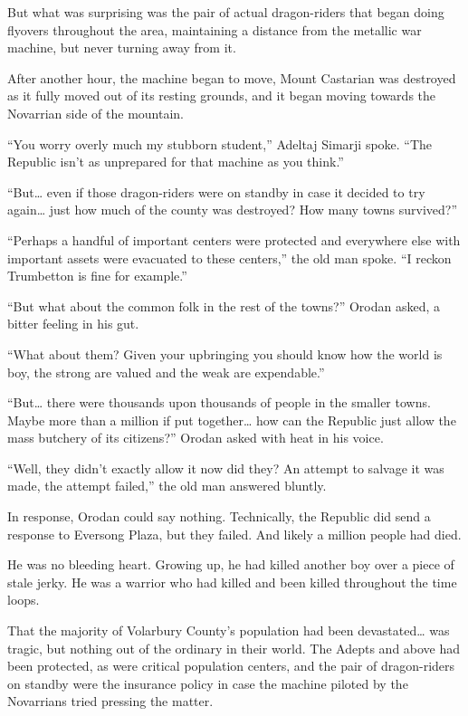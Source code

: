 \documentclass[a4paper,10pt]{book}
\begin{document}
But what was surprising was the pair of actual dragon-riders that began doing flyovers throughout the area, maintaining a distance from the metallic war machine, but never turning away from it.\par
After another hour, the machine began to move, Mount Castarian was destroyed as it fully moved out of its resting grounds, and it began moving towards the Novarrian side of the mountain.\par
“You worry overly much my stubborn student,” Adeltaj Simarji spoke. “The Republic isn’t as unprepared for that machine as you think.”\par
“But… even if those dragon-riders were on standby in case it decided to try again… just how much of the county was destroyed? How many towns survived?”\par
“Perhaps a handful of important centers were protected and everywhere else with important assets were evacuated to these centers,” the old man spoke. “I reckon Trumbetton is fine for example.”\par
“But what about the common folk in the rest of the towns?” Orodan asked, a bitter feeling in his gut.\par
“What about them? Given your upbringing you should know how the world is boy, the strong are valued and the weak are expendable.”\par
“But… there were thousands upon thousands of people in the smaller towns. Maybe more than a million if put together… how can the Republic just allow the mass butchery of its citizens?” Orodan asked with heat in his voice.\par
“Well, they didn’t exactly allow it now did they? An attempt to salvage it was made, the attempt failed,” the old man answered bluntly.\par
In response, Orodan could say nothing. Technically, the Republic did send a response to Eversong Plaza, but they failed. And likely a million people had died.\par
He was no bleeding heart. Growing up, he had killed another boy over a piece of stale jerky. He was a warrior who had killed and been killed throughout the time loops.\par
That the majority of Volarbury County’s population had been devastated… was tragic, but nothing out of the ordinary in their world. The Adepts and above had been protected, as were critical population centers, and the pair of dragon-riders on standby were the insurance policy in case the machine piloted by the Novarrians tried pressing the matter.\par
\end{document}
